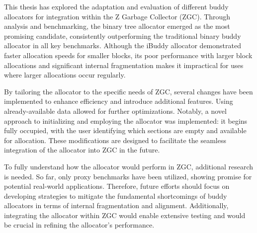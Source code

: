 This thesis has explored the adaptation and evaluation of different buddy allocators for integration within the Z Garbage Collector (ZGC). Through analysis and benchmarking, the binary tree allocator emerged as the most promising candidate, consistently outperforming the traditional binary buddy allocator in all key benchmarks. Although the iBuddy allocator demonstrated faster allocation speeds for smaller blocks, its poor performance with larger block allocations and significant internal fragmentation makes it impractical for uses where larger allocations occur regularly.

By tailoring the allocator to the specific needs of ZGC, several changes have been implemented to enhance efficiency and introduce additional features. Using already-available data allowed for further optimizations. Notably, a novel approach to initializing and employing the allocator was implemented: it begins fully occupied, with the user identifying which sections are empty and available for allocation. These modifications are designed to facilitate the seamless integration of the allocator into ZGC in the future.

To fully understand how the allocator would perform in ZGC, additional research is needed. So far, only proxy benchmarks have been utilized, showing promise for potential real-world applications. Therefore, future efforts should focus on developing strategies to mitigate the fundamental shortcomings of buddy allocators in terms of internal fragmentation and alignment. Additionally, integrating the allocator within ZGC would enable extensive testing and would be crucial in refining the allocator's performance.

